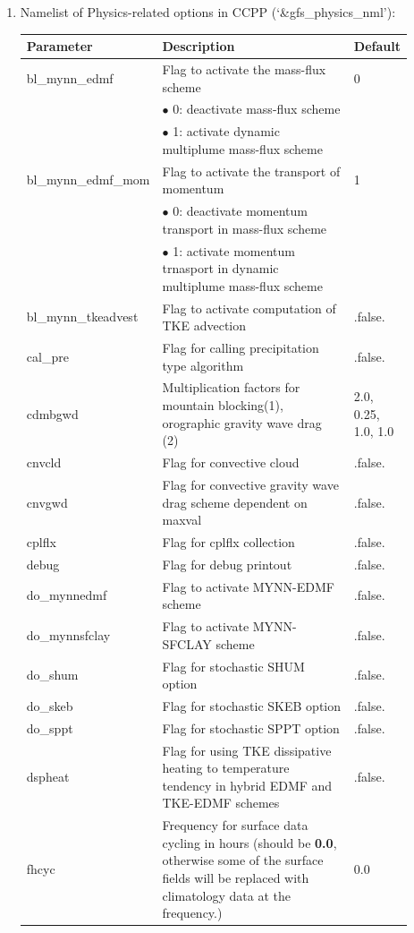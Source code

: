 \documentclass[11pt,fleqn]{report}              %
\begin{document}
\begin{enumerate}
\item Namelist of Physics-related options in CCPP (`\&gfs\_physics\_nml'):
{
\scriptsize
\begin{longtable}{p{0.17\linewidth} | p{0.65\linewidth} | p{0.08\linewidth} }
\hline
\hline
Parameter & Description & Default \\
\hline
 bl\_mynn\_edmf & Flag to activate the mass-flux scheme & 0 \\
& $\bullet$ 0: deactivate mass-flux scheme & \\
& $\bullet$ 1: activate dynamic multiplume mass-flux scheme & \\
 bl\_mynn\_edmf\_mom & Flag to activate the transport of momentum & 1 \\
& $\bullet$ 0: deactivate momentum transport in mass-flux scheme & \\
& $\bullet$ 1: activate momentum trnasport in dynamic multiplume mass-flux scheme & \\
 bl\_mynn\_tkeadvest & Flag to activate computation of TKE advection & .false. \\
 cal\_pre & Flag for calling precipitation type algorithm & .false. \\
 cdmbgwd & Multiplication factors for mountain blocking(1), orographic gravity wave drag (2) & 2.0, 0.25, 1.0, 1.0 \\
 cnvcld & Flag for convective cloud & .false. \\
 cnvgwd & Flag for convective gravity wave drag scheme dependent on maxval & .false. \\
 cplflx & Flag for cplflx collection & .false. \\
 debug & Flag for debug printout & .false. \\
do\_mynnedmf & Flag to activate MYNN-EDMF scheme & .false. \\
do\_mynnsfclay & Flag to activate MYNN-SFCLAY scheme & .false. \\
do\_shum & Flag for stochastic SHUM option & .false.\\
do\_skeb & Flag for stochastic SKEB option & .false. \\
do\_sppt & Flag for stochastic SPPT option & .false. \\
dspheat & Flag for using TKE dissipative heating to temperature tendency in hybrid EDMF and TKE-EDMF schemes & .false. \\
fhcyc & Frequency for surface data cycling in hours (should be {\bf 0.0}, otherwise some of the surface fields will be replaced with climatology data at the frequency.) & 0.0 \\

\end{longtable}}
\end{enumerate}
\end{document}
